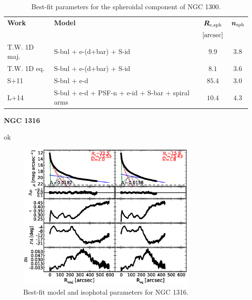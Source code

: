 \documentclass[preprint2]{emulateapj}
\newcommand{\fitfigurewidth}{0.8\textwidth}
\begin{document}
  \begin{table}[h]
  \small
  \caption{Best-fit parameters for the spheroidal component of NGC 1300.}
  \begin{center}
  \begin{tabular}{llcc}
  \hline
  {\bf Work} & {\bf Model}   & $\bm R_{\rm e,sph}$    & $\bm n_{\rm sph}$ \\
    &  &  $[\rm arcsec]$ & \\
  \hline
  T.W. 1D maj. & S-bul + e-(d+bar) + S-id & $9.9$  &  $3.8$ \\
  T.W. 1D eq.  & S-bul + e-(d+bar) + S-id & $8.1$  &  $3.6$ \\
  \hline
  S+11    & S-bul + e-d & $85.4$  &  $3.0$ \\
  L+14    & S-bul + e-d + PSF-n + e-id + S-bar + spiral arms & $10.4$  &  $4.3$ \\
  \hline
  \end{tabular}
  \end{center}
  \label{tab:n1300}
  \end{table}

  \clearpage\newpage\noindent
  {\bf NGC 1316 \\}

  ok

  \begin{figure}[h]
  \begin{center}
  \includegraphics[width=\fitfigurewidth]{images/n1316_1Dfit.eps}
  \caption{Best-fit model and isophotal parameters for NGC 1316.}
  \end{center}
  \end{figure}
\end{document}

